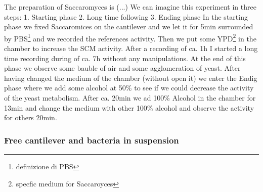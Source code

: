 \documentclass[11pt, a4paper]{article}
\begin{document}
The preparation of Saccaromyces is (...)
We can imagine this experiment in three steps: 1. Starting  phase 2. Long time following 3. Ending phase
In the starting phase we fixed Saccaromices on the cantilever and we let it for 5min surrounded by PBS\footnote{definizione di PBS} and we recorded the references activity. Then we put some YPD\footnote{specfic medium for Saccaroyces} in the chamber to increase the SCM activity. After a recording of ca. 1h I started a long time recording during of ca. 7h without any manipulations.  At the end of this phase we observe some bauble of air and some agglomeration of yeast. After having changed the medium of the chamber (without open it) we enter the Endig phase where we add some alcohol at 50\% to see if we could decrease the activity of the yeast metabolism. After ca. 20min we ad 100\% Alcohol in the chamber for 13min and change the medium with other 100\% alcohol and observe the activity for others 20min. 


\subsubsection{Free cantilever and bacteria in suspension} %
\end{document}
